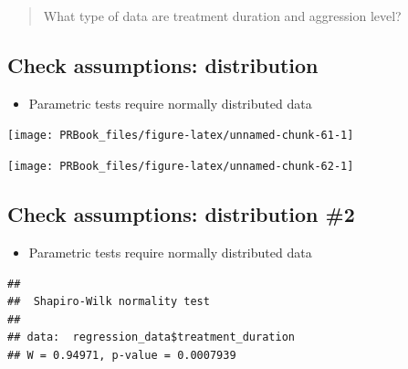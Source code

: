 \documentclass[
]{book}
\newenvironment{Shaded}{\begin{snugshade}}{\end{snugshade}}
\newcommand{\KeywordTok}[1]{\textcolor[rgb]{0.13,0.29,0.53}{\textbf{#1}}}
\newcommand{\NormalTok}[1]{#1}
\newcommand{\OperatorTok}[1]{\textcolor[rgb]{0.81,0.36,0.00}{\textbf{#1}}}
\providecommand{\tightlist}{%
  \setlength{\itemsep}{0pt}\setlength{\parskip}{0pt}}
\begin{document}
\begin{quote}
What type of data are treatment duration and aggression level?
\end{quote}

\hypertarget{check-assumptions-distribution}{%
\subsection{Check assumptions: distribution}\label{check-assumptions-distribution}}

\begin{itemize}
\tightlist
\item
  Parametric tests require normally distributed data
\end{itemize}

\begin{center}\texttt{[image: PRBook\_files/figure-latex/unnamed-chunk-61-1]} \end{center}

\begin{center}\texttt{[image: PRBook\_files/figure-latex/unnamed-chunk-62-1]} \end{center}

\hypertarget{check-assumptions-distribution-2}{%
\subsection{Check assumptions: distribution \#2}\label{check-assumptions-distribution-2}}

\begin{itemize}
\tightlist
\item
  Parametric tests require normally distributed data
\end{itemize}

\begin{Shaded}
\end{Shaded}

\begin{verbatim}
## 
##  Shapiro-Wilk normality test
## 
## data:  regression_data$treatment_duration
## W = 0.94971, p-value = 0.0007939
\end{verbatim}

\begin{Shaded}
\end{Shaded}
\end{document}
